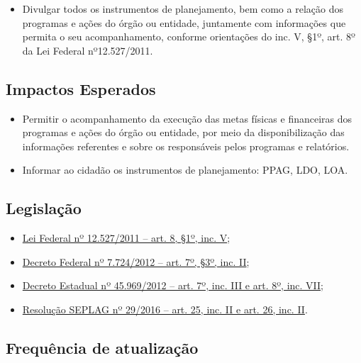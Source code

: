 \documentclass[]{book}
\providecommand{\tightlist}{%
  \setlength{\itemsep}{0pt}\setlength{\parskip}{0pt}}
\begin{document}
\begin{itemize}
\tightlist
\item
  Divulgar todos os instrumentos de planejamento, bem como a relação dos programas e ações do órgão ou entidade, juntamente com informações que permita o seu acompanhamento, conforme orientações do inc. V, §1º, art. 8º da Lei Federal nº12.527/2011.
\end{itemize}

\hypertarget{impactos-esperados-3}{%
\subsection{Impactos Esperados}\label{impactos-esperados-3}}

\begin{itemize}
\tightlist
\item
  Permitir o acompanhamento da execução das metas físicas e financeiras dos programas e ações do órgão ou entidade, por meio da disponibilização das informações referentes e sobre os responsáveis pelos programas e relatórios.
\item
  Informar ao cidadão os instrumentos de planejamento: PPAG, LDO, LOA.
\end{itemize}

\hypertarget{legislauxe7uxe3o-3}{%
\subsection{Legislação}\label{legislauxe7uxe3o-3}}

\begin{itemize}
\tightlist
\item
  \href{http://www.planalto.gov.br/ccivil_03/_ato2011-2014/2011/lei/l12527.htm\#art8}{Lei Federal nº 12.527/2011 -- art. 8, §1º, inc. V};
\item
  \href{http://www.planalto.gov.br/ccivil_03/_ato2011-2014/2012/decreto/d7724.htm}{Decreto Federal nº 7.724/2012 -- art. 7º, §3º, inc. II};
\item
  \href{https://www.almg.gov.br/consulte/legislacao/completa/completa.html?tipo=DEC\&num=45969\&ano=2012}{Decreto Estadual nº 45.969/2012 -- art. 7º, inc. III e art. 8º, inc. VII};
\item
  \href{http://www.planejamento.mg.gov.br/sites/default/files/documentos/resolucao_sitios_seplag_29_de_05_07_2016_1.pdf}{Resolução SEPLAG nº 29/2016 -- art. 25, inc. II e art. 26, inc. II}.
\end{itemize}

\hypertarget{frequuxeancia-de-atualizauxe7uxe3o-2}{%
\subsection{Frequência de atualização}\label{frequuxeancia-de-atualizauxe7uxe3o-2}}
\end{document}
